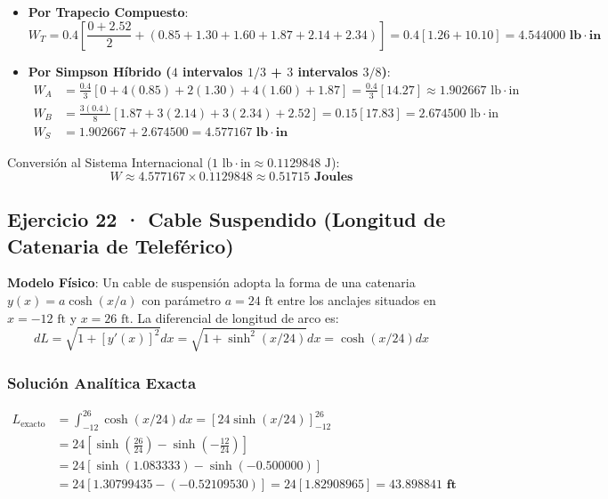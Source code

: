 \documentclass[11pt,a4paper]{article}
\begin{document}
\begin{itemize}
    \item \textbf{Por Trapecio Compuesto}:
    $$W_T = 0.4 \left[ \frac{0 + 2.52}{2} + (0.85 + 1.30 + 1.60 + 1.87 + 2.14 + 2.34) \right] = 0.4 [1.26 + 10.10] = \mathbf{4.544000 \text{ lb}\cdot\text{in}}$$
    \item \textbf{Por Simpson Híbrido ($4$ intervalos $1/3$ + $3$ intervalos $3/8$)}:
    \begin{align*}
    W_A &= \frac{0.4}{3} [0 + 4(0.85) + 2(1.30) + 4(1.60) + 1.87] = \frac{0.4}{3} [14.27] \approx 1.902667 \text{ lb}\cdot\text{in} \\
    W_B &= \frac{3(0.4)}{8} [1.87 + 3(2.14) + 3(2.34) + 2.52] = 0.15 [17.83] = 2.674500 \text{ lb}\cdot\text{in} \\
    W_S &= 1.902667 + 2.674500 = \mathbf{4.577167 \text{ lb}\cdot\text{in}}
    \end{align*}
\end{itemize}
\noindent Conversión al Sistema Internacional ($1\text{ lb}\cdot\text{in} \approx 0.1129848\text{ J}$):
$$W \approx 4.577167 \times 0.1129848 \approx \mathbf{0.51715 \text{ Joules}}$$

\subsection{Ejercicio 22 · Cable Suspendido (Longitud de Catenaria de Teleférico)}

\textbf{Modelo Físico}: Un cable de suspensión adopta la forma de una catenaria $y(x) = a \cosh(x/a)$ con parámetro $a = 24\text{ ft}$ entre los anclajes situados en $x = -12\text{ ft}$ y $x = 26\text{ ft}$.
La diferencial de longitud de arco es:
\begin{equation}
dL = \sqrt{1 + [y'(x)]^2} dx = \sqrt{1 + \sinh^2(x/24)} dx = \cosh(x/24) dx
\end{equation}

\subsubsection{Solución Analítica Exacta}
\begin{align*}
L_{\text{exacto}} &= \int_{-12}^{26} \cosh(x/24) dx = \left[ 24 \sinh(x/24) \right]_{-12}^{26} \\
                  &= 24 \left[ \sinh\left(\frac{26}{24}\right) - \sinh\left(-\frac{12}{24}\right) \right] \\
                  &= 24 \left[ \sinh(1.083333) - \sinh(-0.500000) \right] \\
                  &= 24 [1.30799435 - (-0.52109530)] = 24 [1.82908965] = \mathbf{43.898841 \text{ ft}}
\end{align*}
\end{document}
